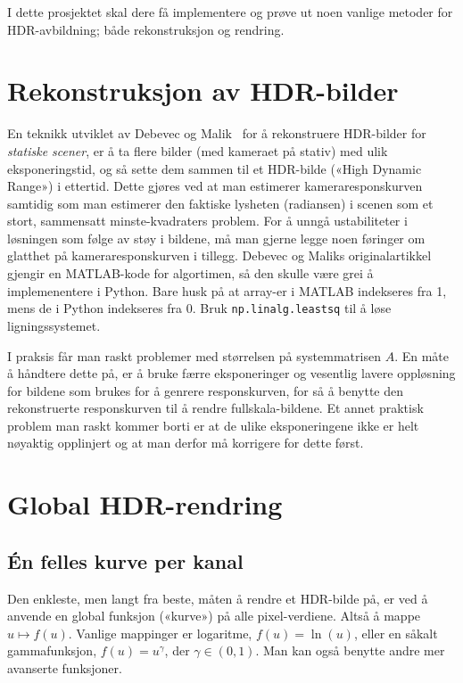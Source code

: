 \documentclass[11pt,a4paper]{article}
\begin{document}
I dette prosjektet skal dere få implementere og prøve ut noen vanlige metoder for HDR-avbildning; både rekonstruksjon og rendring.

\section{Rekonstruksjon av HDR-bilder}
\label{sec:debevec_malik}

En teknikk utviklet av Debevec og Malik~\cite{Debevec:97} for å rekonstruere HDR-bilder for \emph{statiske scener}, er å ta flere bilder (med kameraet på stativ) med ulik eksponeringstid, og så sette dem sammen til et HDR-bilde («High Dynamic Range») i ettertid. Dette gjøres ved at man estimerer kameraresponskurven samtidig som man estimerer den faktiske lysheten (radiansen) i scenen som et stort, sammensatt minste-kvadraters problem. For å unngå ustabiliteter i løsningen som følge av støy i bildene, må man gjerne legge noen føringer om glatthet på kameraresponskurven i tillegg. Debevec og Maliks originalartikkel gjengir en MATLAB-kode for algortimen, så den skulle være grei å implemenentere i Python. Bare husk på at array-er i MATLAB indekseres fra 1, mens de i Python indekseres fra 0. Bruk \texttt{np.linalg.leastsq} til å løse ligningssystemet.

I praksis får man raskt problemer med størrelsen på systemmatrisen $A$. En måte å håndtere dette på, er å bruke færre eksponeringer og vesentlig lavere oppløsning for bildene som brukes for å genrere responskurven, for så å benytte den rekonstruerte responskurven til å rendre fullskala-bildene. Et annet praktisk problem man raskt kommer borti er at de ulike eksponeringene ikke er helt nøyaktig opplinjert og at man derfor må korrigere for dette først.

\section{Global HDR-rendring}

\subsection{Én felles kurve per kanal}
\label{sec:glob:felles}

Den enkleste, men langt fra beste, måten å rendre et HDR-bilde på, er ved å anvende en global funksjon («kurve») på alle pixel-verdiene. Altså å mappe $u \mapsto f(u)$. Vanlige mappinger er logaritme, $f(u) = \ln(u)$, eller en såkalt gammafunksjon, $f(u) = u^\gamma$, der $\gamma \in (0, 1)$. Man kan også benytte andre mer avanserte funksjoner.
\end{document}
